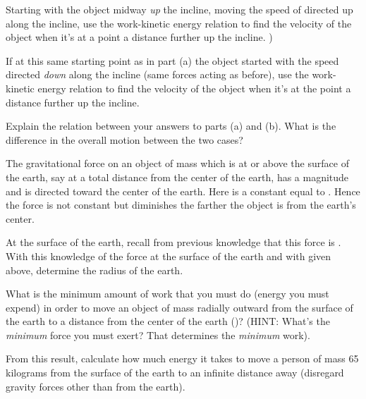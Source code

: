 {\begin{two-digit-list}
\item [20.] 

\begin{one-digit-list}
\item [a.] Starting with the object midway \textit{up} the incline, moving the
speed of  directed up along the incline, use the work-kinetic energy
relation to find the velocity of the object when it's at a point a distance
 further up the incline. ) 
\item [b.] If at this same starting point as in part (a) the object started
with the speed  directed \textit{down} along the incline (same forces
acting as before), use the work-kinetic energy relation to find the velocity
of the object when it's at the point a distance  further up the incline.
 
\item [c.] Explain the relation between your answers to parts (a) and (b).
What is the difference in the overall motion between the two cases? 
\end{one-digit-list}

\item [21.] The gravitational force on an object of mass  which is at or
above the surface of the earth, say at a total distance  from the center of
the earth, has a magnitude  and is directed toward the center of the
earth.
Here  is a constant equal to .
Hence the force is not constant but diminishes the farther the object is
from the earth's center.
\begin{one-digit-list}
\item [a.] At the surface of the earth, recall from previous knowledge that
this force is .
With this knowledge of the force at the surface of the earth and with 
given above, determine the radius of the earth.  
\item [b.] What is the minimum amount of work that you must do (energy you must
expend) in order to move an object of mass  radially outward from the
surface of the earth to a distance  from the center of the earth
()? 
(HINT: What's the \textit{minimum} force you must exert?
That determines the \textit{minimum} work).  
\item [c.] From this result, calculate how much energy it takes to move a
person of mass 65\,\unit{kilograms} from the surface of the earth to an infinite
distance away (disregard gravity forces other than from the earth). 
\end{one-digit-list}


\end{two-digit-list}}
